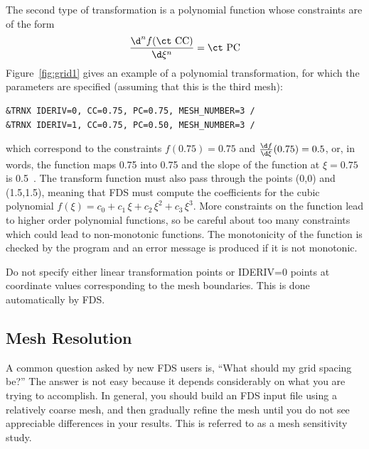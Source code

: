 \documentclass[11pt]{book}
\begin{document}
The second type of transformation is a polynomial function whose constraints are of the form
\[ \frac{\d^n f(\hbox{\ct CC})}{\d\xi^n} = \hbox{\ct PC}   \]
Figure~\ref{fig:grid1} gives an example of a polynomial transformation, for which the parameters are specified (assuming that this is the third mesh):
\begin{lstlisting}
&TRNX IDERIV=0, CC=0.75, PC=0.75, MESH_NUMBER=3 /
&TRNX IDERIV=1, CC=0.75, PC=0.50, MESH_NUMBER=3 /
\end{lstlisting}
which correspond to the constraints
$f(0.75)=0.75$ and $\frac{\d f}{\d \xi}(0.75) = 0.5$, or, in words, the
function maps 0.75 into 0.75 and the slope of the function at
$\xi=0.75$ is 0.5~.
The transform function must also pass through the points (0,0) and (1.5,1.5), meaning that FDS must compute the coefficients for the cubic polynomial $f(\xi) = c_0 + c_1 \, \xi + c_2 \, \xi^2 + c_3 \, \xi^3$. More constraints on the function lead to higher order polynomial functions, so be careful about too many constraints which could lead to non-monotonic functions. The monotonicity of the function is checked by the program and an error message is produced if it is not monotonic.

Do not specify either linear transformation points or {\ct IDERIV=0} points at coordinate values corresponding to the mesh boundaries. This is done automatically by FDS.


\subsection{Mesh Resolution}
\label{info:Mesh_Resolution}

A common question asked by new FDS users is, ``What should my grid spacing be?'' The answer is not easy because it depends considerably on what you are trying to accomplish. In general, you should build an FDS input file using a relatively coarse mesh, and then gradually refine the mesh until you do not see appreciable differences in your results. This is referred to as a mesh sensitivity study.
\end{document}
